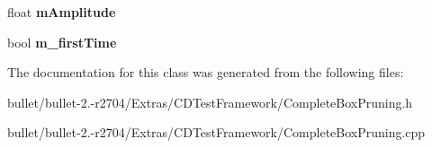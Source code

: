 \begin{DoxyCompactItemize}
\item 
\hypertarget{class_complete_box_pruning_test_ad3f4c331b4d5c53a888ee1f1d9572b3f}{float {\bfseries m\+Amplitude}}\label{class_complete_box_pruning_test_ad3f4c331b4d5c53a888ee1f1d9572b3f}

\item 
\hypertarget{class_complete_box_pruning_test_aed86a3d89e4dc121ab410b8632fe5428}{bool {\bfseries m\+\_\+first\+Time}}\label{class_complete_box_pruning_test_aed86a3d89e4dc121ab410b8632fe5428}

\end{DoxyCompactItemize}


The documentation for this class was generated from the following files\+:\begin{DoxyCompactItemize}
\item 
bullet/bullet-\/2.-\/r2704/\+Extras/\+C\+D\+Test\+Framework/Complete\+Box\+Pruning.\+h\item 
bullet/bullet-\/2.-\/r2704/\+Extras/\+C\+D\+Test\+Framework/Complete\+Box\+Pruning.\+cpp\end{DoxyCompactItemize}
